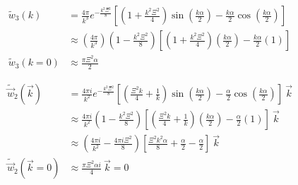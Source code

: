 \documentclass[double,12pt]{beavtex}
\begin{document}
\begin{align}
  \widetilde{w}_3(k) &= \frac{4\pi}{k^3}e^{-\frac{k^2\Xi^2}{8}}
    \left[\left(1+\frac{k^2\Xi^2}{4}\right)\sin\left(\frac{k\alpha}{2}
    \right)-\frac{k\alpha}{2}\cos\left(\frac{k\alpha}{2}\right)\right]\\
    & \approx \left(\frac{4\pi}{k^3}\right)\left(1-\frac{k^2\Xi^2}{8}
    \right)\left[\left(1+\frac{k^2\Xi^2}{4}\right)\left(\frac{k\alpha}
    {2}\right)-\frac{k\alpha}{2}\left(1\right)\right] \\
     \widetilde{w}_3(k=0) & \approx \frac{\pi\Xi^2\alpha}{2}
\end{align}

\begin{align}
   \widetilde{\vec{w}}_2(\vec{k})&= \frac{4\pi{i}}{k^2}
   e^{-\frac{k^2\Xi^2}{8}}
   \left[\left(\frac{\Xi^2k}{4}+\frac{1}{k}\right)\sin\left(
   \frac{k\alpha}{2}\right)
   -\frac{\alpha}{2}\cos\left(\frac{k\alpha}{2}\right)\right]
   {~}\vec{k} \\
    & \approx  \frac{4\pi{i}}{k^2}\left(1-\frac{k^2\Xi^2}{8}\right)
    \left[\left(\frac{\Xi^2k}{4}+\frac{1}{k}\right)\left(\frac{k\alpha}
    {2}\right)-\frac{\alpha}{2}\left(1\right)\right]{~}\vec{k}\\
    & \approx  \left(\frac{4\pi{i}}{k^2}-\frac{4\pi i\Xi^2}{8}\right)
    \left[\frac{\Xi^2k^2\alpha}{8}+\frac{\alpha}{2}-\frac{\alpha}{2}
    \right]{~}\vec{k} \\
    \widetilde{\vec w}_2(\vec k=0) & \approx \frac{\pi\Xi^2\alpha i}{4} 
    {~}\vec{k} = 0
\end{align}
\end{document}
